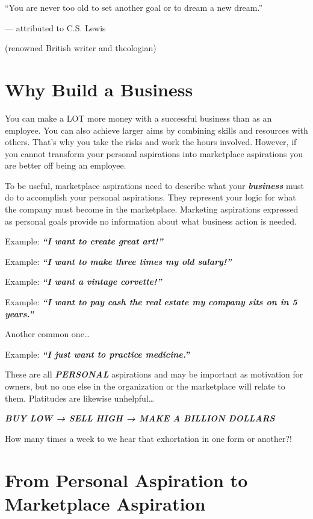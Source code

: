 \documentclass[
]{book}
\begin{document}
``You are never too old to set another goal or to dream a new dream.''

--- attributed to C.S. Lewis

(renowned British writer and theologian)

\hypertarget{why-build-a-business}{%
\section{Why Build a Business}\label{why-build-a-business}}

You can make a LOT more money with a successful business than as an employee. You can also achieve larger aims by combining skills and resources with others. That's why you take the risks and work the hours involved. However, if you cannot transform your personal aspirations into marketplace aspirations you are better off being an employee.

To be useful, marketplace aspirations need to describe what your \textbf{\emph{business}} must do to accomplish your personal aspirations. They represent your logic for what the company must become in the marketplace. Marketing aspirations expressed as personal goals provide no information about what business action is needed.

{Example: \textbf{\emph{``I want to create great art!''}}}

{Example: \textbf{\emph{``I want to make three times my old salary!''}}}

{Example: \textbf{\emph{``I want a vintage corvette!''}}}

{Example: \textbf{\emph{``I want to pay cash the real estate my company sits on in 5 years.''}}}

Another common one\ldots{}

{Example: \textbf{\emph{``I just want to practice medicine.''}}}

These are all \textbf{\emph{PERSONAL}} aspirations and may be important as motivation for owners, but no one else in the organization or the marketplace will relate to them. Platitudes are likewise unhelpful\ldots{}

{\textbf{\emph{BUY LOW → SELL HIGH → MAKE A BILLION DOLLARS}}}

How many times a week to we hear that exhortation in one form or another?!

\hypertarget{from-personal-aspiration-to-marketplace-aspiration}{%
\section{From Personal Aspiration to Marketplace Aspiration}\label{from-personal-aspiration-to-marketplace-aspiration}}
\end{document}
